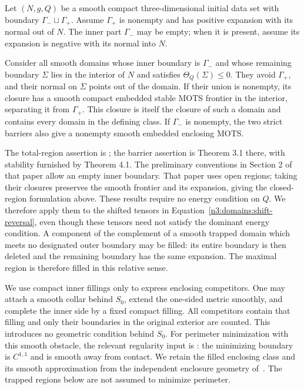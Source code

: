 \begin{theorem}
\label{n3:domains:region-theorem}
Let $(N,g,Q)$ be a smooth compact three-dimensional initial data set
with boundary $\Gamma_-\sqcup\Gamma_+$.  Assume $\Gamma_+$ is nonempty
and has positive expansion with its normal out of $N$.  The inner part
$\Gamma_-$ may be empty; when it is present, assume its expansion is
negative with its normal into $N$.

Consider all smooth domains whose inner boundary is $\Gamma_-$ and
whose remaining boundary $\Sigma$ lies in the interior of $N$ and
satisfies $\Theta_Q(\Sigma)\leq0$.  They avoid $\Gamma_+$, and their
normal on $\Sigma$ points out of the domain.  If their union is
nonempty, its closure has a smooth compact embedded stable MOTS
frontier in the interior, separating it from $\Gamma_+$.  This closure
is itself the closure of such a domain and contains every domain in
the defining class.  If $\Gamma_-$ is nonempty, the two strict barriers
also give a nonempty smooth embedded enclosing MOTS.
\end{theorem}

The total-region assertion is
\cite[Definitions 7.1--7.2 and Theorem 7.3]{AnderssonMetzger2009}; the
barrier assertion is Theorem 3.1 there, with stability furnished by
Theorem 4.1.  The preliminary conventions in Section 2 of that paper
allow an empty inner boundary.  That paper uses open regions;
taking their closures preserves the smooth frontier and its expansion,
giving the closed-region formulation above.  These results require no energy
condition on $Q$.  We therefore apply them to the shifted tensors in
Equation~\eqref{n3:domains:shift-reversal}, even though these tensors
need not satisfy the dominant energy condition.  A component of the
complement of a smooth trapped domain which meets no designated outer
boundary may be filled: its entire boundary is then deleted and the
remaining boundary has the same expansion.  The maximal region is
therefore filled in this relative sense.

We use compact inner fillings only to express enclosing competitors.
One may attach a smooth collar behind $S_0$, extend the one-sided
metric smoothly, and complete the inner side by a fixed compact
filling.  All competitors contain that filling and only their
boundaries in the original exterior are counted.  This introduces no
geometric condition behind $S_0$.  For perimeter minimization with
this smooth obstacle, the relevant regularity input is
\cite[Regularity Theorem 1.3(iii)]{HuiskenIlmanen2001}: the minimizing
boundary is $C^{1,1}$ and is smooth away from contact.  We retain the filled enclosing class and its smooth approximation
from the independent enclosure geometry of~\cite[Lemmas~2.1--2.2]{RiemannianCompanion}.  The trapped regions below are not
assumed to minimize perimeter.

